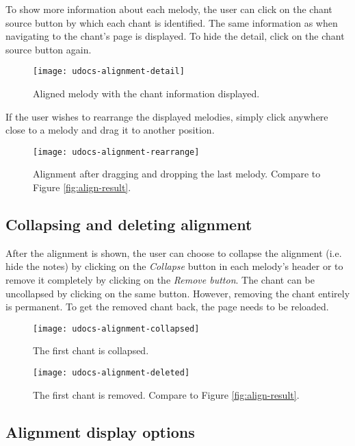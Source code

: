 To show more information about each melody, the user can click on the chant source button by which each chant is identified. The same information as when navigating
to the chant's page is displayed. To hide the detail, click on the chant source button again.

\begin{figure}[!h]
\centering
\texttt{[image: udocs-alignment-detail]}
\caption{Aligned melody with the chant information displayed.}
\label{fig:align-detail}
\end{figure}

If the user wishes to rearrange the displayed melodies, simply click anywhere close to a melody and drag it to another position.

\begin{figure}[!h]
\centering
\texttt{[image: udocs-alignment-rearrange]}
\caption{Alignment after dragging and dropping the last melody. Compare to Figure \ref{fig:align-result}.}
\label{fig:align-rearrange}
\end{figure}

\subsection{Collapsing and deleting alignment}

After the alignment is shown, the user can choose to collapse the alignment (i.e. hide the notes) by clicking on the \emph{Collapse} button
in each melody's header or to remove it completely by clicking on the \emph{Remove button}. The chant can be uncollapsed by clicking
on the same button. However, removing the chant entirely is permanent. To get the removed chant back, the page needs to be reloaded.

\begin{figure}[!h]
\centering
\texttt{[image: udocs-alignment-collapsed]}
\caption{The first chant is collapsed.}
\label{fig:align-collapsed}
\end{figure}

\begin{figure}[!h]
\centering
\texttt{[image: udocs-alignment-deleted]}
\caption{The first chant is removed. Compare to Figure \ref{fig:align-result}.}
\label{fig:align-removed}
\end{figure}

\subsection{Alignment display options}

